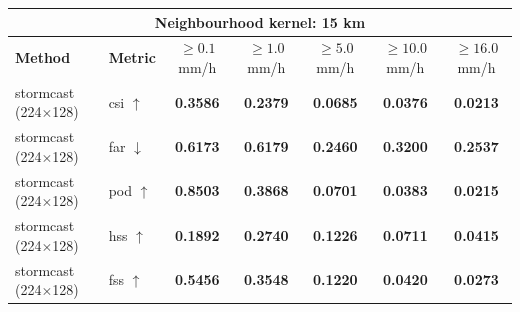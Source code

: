 \documentclass[border=10pt]{standalone}
\begin{document}
\begin{tabular}{llccccc}
\toprule
\multicolumn{7}{c}{\textbf{Neighbourhood kernel: 15 km}} \\
\midrule
\textbf{Method} & \textbf{Metric} & $\geq 0.1$ mm/h & $\geq 1.0$ mm/h & $\geq 5.0$ mm/h & $\geq 10.0$ mm/h & $\geq 16.0$ mm/h \\
\midrule
stormcast (224$\times$128) & csi $\uparrow$ & \textbf{0.3586} & \textbf{0.2379} & \textbf{0.0685} & \textbf{0.0376} & \textbf{0.0213} \\
\midrule
stormcast (224$\times$128) & far $\downarrow$ & \textbf{0.6173} & \textbf{0.6179} & \textbf{0.2460} & \textbf{0.3200} & \textbf{0.2537} \\
\midrule
stormcast (224$\times$128) & pod $\uparrow$ & \textbf{0.8503} & \textbf{0.3868} & \textbf{0.0701} & \textbf{0.0383} & \textbf{0.0215} \\
\midrule
stormcast (224$\times$128) & hss $\uparrow$ & \textbf{0.1892} & \textbf{0.2740} & \textbf{0.1226} & \textbf{0.0711} & \textbf{0.0415} \\
\midrule
stormcast (224$\times$128) & fss $\uparrow$ & \textbf{0.5456} & \textbf{0.3548} & \textbf{0.1220} & \textbf{0.0420} & \textbf{0.0273} \\
\bottomrule
\end{tabular}
\end{document}
